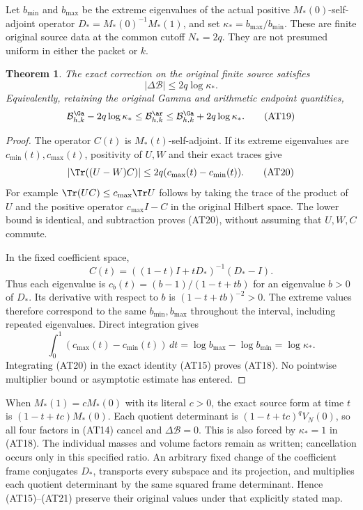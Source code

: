 \documentclass[10pt,a4paper,oneside]{report}
\newtheorem{theorem}{Theorem}[chapter]
\begin{document}
Let $b_{\min}$ and $b_{\max}$ be the extreme eigenvalues of the
actual positive $M_*(0)$-self-adjoint operator
$D_*=M_*(0)^{-1}M_*(1)$, and set
$\kappa_*=b_{\max}/b_{\min}$. These are finite original source
data at the common cutoff $N_*=2q$. They are not presumed
uniform in either the packet or $k$.

\begin{theorem}
The exact correction on the original finite source satisfies
\[
 \boxed{|\Delta\mathcal B|\le2q\log\kappa_* .}             \tag{AT18}
\]
Equivalently, retaining the original Gamma and arithmetic endpoint
quantities,
\[
 \mathcal B^\Ga_{h,k}-2q\log\kappa_*
 \le\mathcal B^\ar_{h,k}
 \le\mathcal B^\Ga_{h,k}+2q\log\kappa_* .                \tag{AT19}
\]
\end{theorem}
\begin{proof}
The operator $C(t)$ is $M_*(t)$-self-adjoint. If its extreme
eigenvalues are $c_{\min}(t),c_{\max}(t)$, positivity of $U,W$
and their exact traces give
\[
 |\Tr((U-W)C)|\le2q(c_{\max}(t)-c_{\min}(t)).             \tag{AT20}
\]
For example $\Tr(UC)\le c_{\max}\Tr U$ follows by taking
the trace of the product of $U$ and the positive operator
$c_{\max}I-C$ in the original Hilbert space. The lower bound
is identical, and subtraction proves (AT20), without assuming
that $U,W,C$ commute.

In the fixed coefficient space,
\[
 C(t)=((1-t)I+tD_*)^{-1}(D_*-I).
\]
Thus each eigenvalue is
$c_b(t)=(b-1)/(1-t+tb)$ for an eigenvalue $b>0$ of $D_*$.
Its derivative with respect to $b$ is $(1-t+tb)^{-2}>0$.
The extreme values therefore correspond to the same
$b_{\min},b_{\max}$ throughout the interval, including repeated
eigenvalues. Direct integration gives
\[
 \int_0^1(c_{\max}(t)-c_{\min}(t))\,dt
 =\log b_{\max}-\log b_{\min}=\log\kappa_* .             \tag{AT21}
\]
Integrating (AT20) in the exact identity (AT15) proves (AT18).
No pointwise multiplier bound or asymptotic estimate has entered.
\end{proof}

When $M_*(1)=cM_*(0)$ with its literal $c>0$, the exact source
form at time $t$ is $(1-t+tc)M_*(0)$. Each quotient determinant
is $(1-t+tc)^qV_N(0)$, so all four factors in (AT14) cancel
and $\Delta\mathcal B=0$. This is also forced by
$\kappa_*=1$ in (AT18). The individual masses and volume
factors remain as written; cancellation occurs only in this
specified ratio. An arbitrary fixed change of the coefficient
frame conjugates $D_*$, transports every subspace and its
projection, and multiplies each quotient determinant by the
same squared frame determinant. Hence (AT15)--(AT21) preserve
their original values under that explicitly stated map.
\end{document}

